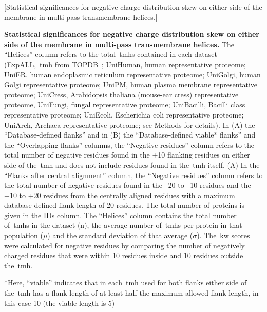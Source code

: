 \begin{table}[htbp]
  \centering
  [Statistical significances for negative charge distribution skew on either side of the membrane in multi-pass transmembrane helices.]{\textbf{Statistical significances for negative charge distribution skew on either side of the membrane in multi-pass transmembrane helices.}
The ``Helices'' column refers to the total~\gls{tmh}s contained in each dataset (ExpALL,~\gls{tmh} from TOPDB~\cite{Dobson2015}; UniHuman, human representative proteome; UniER, human endoplasmic reticulum representative proteome; UniGolgi, human Golgi representative proteome; UniPM, human plasma membrane representative proteome; UniCress, Arabidopsis thaliana (mouse-ear cress) representative proteome, UniFungi, fungal representative proteome; UniBacilli, Bacilli class representative proteome; UniEcoli, Escherichia coli representative proteome; UniArch, Archaea representative proteome; see Methods for details).
In (A) the ``Database-defined flanks'' and in (B) the ``Database-defined viable* flanks'' and the ``Overlapping flanks'' columns, the ``Negative residues'' column refers to the total number of negative residues found in the $\pm$10 flanking residues on either side of the~\gls{tmh} and does not include residues found in the~\gls{tmh} itself.
(A) In the ``Flanks after central alignment'' column, the ``Negative residues'' column refers to the total number of negative residues found in the –20 to –10 residues and the +10 to +20 residues from the centrally aligned residues with a maximum database defined flank length of 20 residues.
The total number of proteins is given in the IDs column.
The ``Helices'' column contains the total number of~\gls{tmh}s in the dataset (n), the average number of~\gls{tmh}s per protein in that population ($\mu$) and the standard deviation of that average ($\sigma$).
The~\gls{kw} scores were calculated for negative residues by comparing the number of negatively charged residues that were within 10 residues inside and 10 residues outside the~\gls{tmh}.

*Here, ``viable'' indicates that in each~\gls{tmh} used for both flanks either side of the~\gls{tmh} has a flank length of at least half the maximum allowed flank length, in this case 10 (the viable length is 5)}


\end{table}
